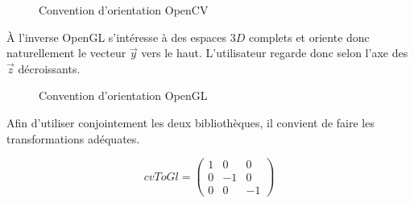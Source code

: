 \documentclass[10pt,a4paper,twoside, twocolumn]{report}
\newcommand*{\rootPath}{../}
\begin{document}
\begin{figure}[!ht]
	\centering
	
	\caption{Convention d’orientation OpenCV}
	\label{fig:tikz:space-opencv}
\end{figure}

À l’inverse OpenGL s’intéresse à des espaces $3D$ complets et oriente donc naturellement le vecteur $\vec y$ vers le haut. L’utilisateur regarde donc selon l’axe des $\vec z$ décroissants.

\begin{figure}[!ht]
	\centering
	
	\caption{Convention d’orientation OpenGL}
	\label{fig:tikz:space-opengl}
\end{figure}

Afin d’utiliser conjointement les deux bibliothèques, il convient de faire les transformations adéquates.

\begin{equation}
	cvToGl = \begin{pmatrix}1 & 0 & 0 \\ 0 & -1 & 0 \\ 0 & 0 & -1\end{pmatrix}
\end{equation}

\ifstandalone
	
	
\fi
\end{document}

